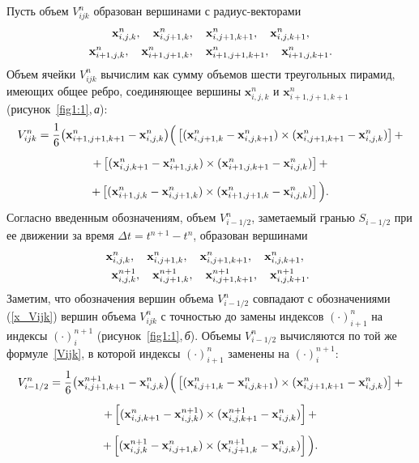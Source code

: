 Пусть объем $V^n_{ijk}$ образован вершинами с радиус-векторами
\begin{gather}
  {\mathbf{x}}^n_{i,j,k}, \quad {\mathbf{x}}^n_{i,j+1,k},\quad {\mathbf{x}}^n_{i,j+1,k+1},
  \quad {\mathbf{x}}^n_{i,j,k+1}, \notag\\
  {\mathbf{x}}^n_{i+1,j,k},\quad {\mathbf{x}}^n_{i+1,j+1,k}, 
  \quad {\mathbf{x}}^n_{i+1,j+1,k+1},\quad {\mathbf{x}}^n_{i+1,j,k+1}.
  \label{x_Vijk}
\end{gather}
Объем ячейки $V^n_{ijk}$ вычислим как сумму объемов шести треугольных пирамид, имеющих общее ребро, 
соединяющее вершины ${\mathbf{x}}^n_{i,j,k}$ и ${\mathbf{x}}^n_{i+1,j+1,k+1}$ (рисунок~\ref{fig1:1},\,\emph{а}):
\begin{gather}
  V^n_{ijk}={\displaystyle{\frac{1}{6}}}\big({\bf{x}}^n_{i+1,j+1,k+1}-{\bf{x}}^n_{i,j,k}\big)
  \Big(
  \left[({\bf{x}}^n_{i,j+1,k}-{\bf{x}}^n_{i,j,k+1})\times
       ({\bf{x}}^n_{i,j+1,k+1}-{\bf{x}}^n_{i,j,k})\right]+ \notag\\[2mm]
 +\left[({\bf{x}}^n_{i,j,k+1}-{\bf{x}}^n_{i+1,j,k})\times
       ({\bf{x}}^n_{i+1,j,k+1}-{\bf{x}}^n_{i,j,k})\right]+\notag \\[2mm]
 +\left[({\bf{x}}^n_{i+1,j,k}-{\bf{x}}^n_{i,j+1,k})\times
       ({\bf{x}}^n_{i+1,j+1,k}-{\bf{x}}^n_{i,j,k})\right] \Big).
  \label{Vijk}
\end{gather}
Согласно введенным обозначениям, объем $V^n_{i-1/2}$, заметаемый гранью $S_{i-1/2}$ при ее движении за 
время $\Delta t=t^{n+1}-t^{n}$, образован вершинами
\begin{gather}
  {\mathbf{x}}^n_{i,j,k},  \quad  {\mathbf{x}}^n_{i,j+1,k},\quad {\mathbf{x}}^n_{i,j+1,k+1}, \quad  
  {\mathbf{x}}^n_{i,j,k+1}, \quad \notag \\
  {\mathbf{x}}^{n+1}_{i,j,k}, \quad  {\mathbf{x}}^{n+1}_{i,j+1,k}, \quad
  {\mathbf{x}}^{n+1}_{i,j+1,k+1},\quad {\mathbf{x}}^{n+1}_{i,j,k+1}.
  \label{x_Vi12}
\end{gather}
Заметим, что обозначения вершин объема $V^n_{i-1/2}$ совпадают с обозначениями (\ref{x_Vijk}) вершин 
объема $V^n_{ijk}$ с точностью до замены индексов $(\cdot)^{n}_{i+1}$ на индексы $(\cdot)^{n+1}_{i}$ 
(рисунок~\ref{fig1:1},\,{\it б}). Объемы $V^n_{i-1/2}$ вычисляются по той же формуле~\eqref{Vijk}, в которой  
индексы $(\cdot)^{n}_{i+1}$ заменены на $(\cdot)^{n+1}_{i}$:
\begin{gather}
  V^n_{i-1/2}={\displaystyle{\frac{1}{6}}}\big({\bf{x}}^{n+1}_{i,j+1,k+1}-{\bf{x}}^n_{i,j,k}\big)
  \Big(
  \left[({\bf{x}}^n_{i,j+1,k}-{\bf{x}}^n_{i,j,k+1})\times
       ({\bf{x}}^n_{i,j+1,k+1}-{\bf{x}}^n_{i,j,k})\right]+ \nonumber\\[2mm]
  \label{Vi12}
  +\left[({\bf{x}}^n_{i,j,k+1}-{\bf{x}}^{n+1}_{i,j,k})\times
       ({\bf{x}}^{n+1}_{i,j,k+1}-{\bf{x}}^n_{i,j,k})\right]+\nonumber \\[2mm]
  +\left[({\bf{x}}^{n+1}_{i,j,k}-{\bf{x}}^n_{i,j+1,k})\times
       ({\bf{x}}^{n+1}_{i,j+1,k}-{\bf{x}}^n_{i,j,k})\right] \Big).
  \label{Vni12}
\end{gather}
